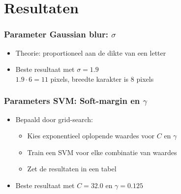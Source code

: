 \documentclass{beamer}
\begin{document}
    \section{Resultaten}

    \begin{frame}
        \frametitle{Parameter Gaussian blur: $\sigma$}

        \begin{itemize}
            \item Theorie: proportioneel aan de dikte van een letter
            \item Beste resultaat met $\sigma = 1.9$ \\
            $1.9 \cdot 6 = 11$ pixels, breedte karakter is 8 pixels
        \end{itemize}
    \end{frame}

    \begin{frame}
        \frametitle{Parameters SVM: Soft-margin en $\gamma$}

        \begin{itemize}
            \item Bepaald door grid-search:
            \begin{itemize}
                \item Kies exponentieel oplopende waardes voor $C$ en $\gamma$
                \item Train een SVM voor elke combinatie van waardes
                \item Zet de resultaten in een tabel
            \end{itemize}
            \item Beste resultaat met $C = 32.0$ en $\gamma = 0.125$
        \end{itemize}
    \end{frame}
\end{document}
